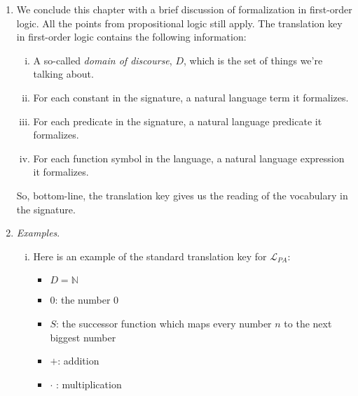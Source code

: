 	\begin{enumerate}[\thesection.1]
	
		\item We conclude this chapter with a brief discussion of formalization in first-order logic. All the points from propositional logic still apply. The translation key in first-order logic contains the following information:
		
		\begin{enumerate}[(i)]
		
			\item A so-called \emph{domain of discourse}, $D$, which is the set of things we're talking about.
			
			\item For each constant in the signature, a natural language term it formalizes.
			
			\item For each predicate in the signature, a natural language predicate it formalizes.
			
			\item For each function symbol in the language, a natural language expression it formalizes.
			
		\end{enumerate}
	So, bottom-line, the translation key gives us the reading of the vocabulary in the signature.
	
	\item \emph{Examples}. 
	
		\begin{enumerate}[(i)]
		
		\item Here is an example of the standard translation key for $\mathcal{L}_{PA}$:
		
			\begin{itemize}
		
				\item $D=\mathbb{N}$
				
				\item $0$: the number 0
				
				\item $S$: the successor function which maps every number $n$ to the next biggest number
				
				\item $+$: addition
				
				\item $\cdot$ : multiplication
		
			\end{itemize}
			

\end{enumerate}
\end{enumerate}
